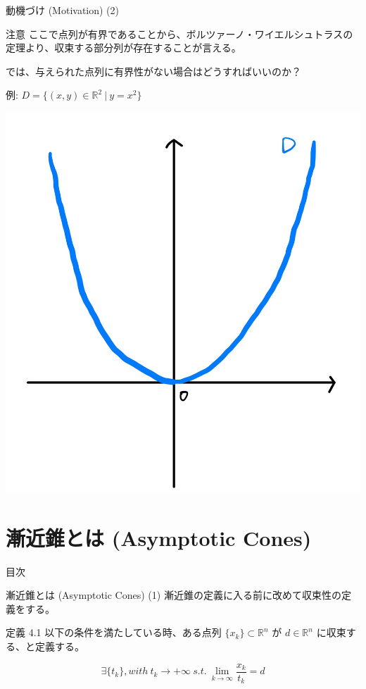 \documentclass[aspectratio=169, dvipdfmx, 11pt]{beamer} %
\begin{document}
\begin{frame}{動機づけ (Motivation) (2) }
  \begin{alertblock}{注意}
    ここで点列が有界であることから、ボルツァーノ・ワイエルシュトラスの定理より、収束する部分列が存在することが言える。
  \end{alertblock}

\pause
  では、与えられた点列に有界性がない場合はどうすればいいのか？
\pause

  例: $D = \{(x,y) \in \mathbb{R}^2 \:|\: y=x^2\}$

  \centering
  \includegraphics[keepaspectratio, scale=0.06]{figures/unbounded_example.jpg}
\end{frame}

\section{漸近錐とは (Asymptotic Cones) }
\begin{frame}{目次}
    \tableofcontents[currentsection]
\end{frame}

\begin{frame}{漸近錐とは (Asymptotic Cones) (1) }
  漸近錐の定義に入る前に改めて収束性の定義をする。
  \begin{block}{定義 4.1}
    以下の条件を満たしている時、ある点列 $\{ x_k \} \subset \mathbb{R} ^n$ が $d \in \mathbb{R} ^n$ に収束する、と定義する。

    \begin{equation}
      \exists\{ t_k \}, with\: t_k \rightarrow +\infty \:s.t.\: \lim_{k \to \infty} \frac{x_k}{t_k} = d \tag*{(2.1)}
    \end{equation}
  \end{block}
\end{frame}
\end{document}
